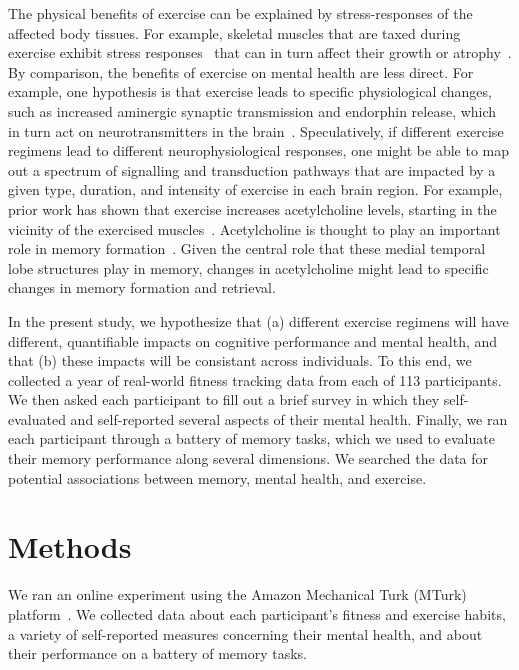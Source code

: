 \documentclass[10pt]{article}
\begin{document}
The physical benefits of exercise can be explained by stress-responses
of the affected body tissues. For example, skeletal muscles that are
taxed during exercise exhibit stress responses~\citep{MortEtal09} that
can in turn affect their growth or atrophy~\citep{SchiEtal13}.  By
comparison, the benefits of exercise on mental health are less direct.
For example, one hypothesis is that exercise leads to specific
physiological changes, such as increased aminergic synaptic
transmission and endorphin release, which in turn act on
neurotransmitters in the brain~\citep{PaluSchw00}.  Speculatively, if
different exercise regimens lead to different neurophysiological
responses, one might be able to map out a spectrum of signalling and
transduction pathways that are impacted by a given type, duration, and
intensity of exercise in each brain region.  For example, prior work
has shown that exercise increases acetylcholine levels, starting in
the vicinity of the exercised muscles~\citep{ShoeEtal97}.
Acetylcholine is thought to play an important role in memory
formation~\citep[e.g., by modulating specific synaptic inputs from
entorhinal cortex to the hippocampus, albeit in
rodents;][]{PalaEtal21}.  Given the central role that these medial
temporal lobe structures play in memory, changes in acetylcholine
might lead to specific changes in memory formation and retrieval.

In the present study, we hypothesize that (a) different exercise
regimens will have different, quantifiable impacts on cognitive
performance and mental health, and that (b) these impacts will be
consistant across individuals.  To this end, we collected a year of
real-world fitness tracking data from each of 113 participants.  We
then asked each participant to fill out a brief survey in which they
self-evaluated and self-reported several aspects of their mental
health.  Finally, we ran each participant through a battery of memory
tasks, which we used to evaluate their memory performance along
several dimensions.  We searched the data for potential associations
between memory, mental health, and exercise.

 \section*{Methods}

    We ran an online experiment using the Amazon Mechanical Turk (MTurk)
    platform~\citep{GureEtal16}.  We collected data about each participant's fitness and
    exercise habits, a variety of self-reported measures concerning their
    mental health, and about their performance on a battery of memory
    tasks.
\end{document}
